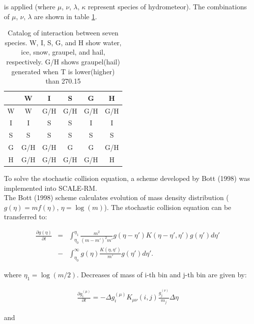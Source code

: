 is applied (where $\mu$, $\nu$, $\lambda$, $\kappa$ represent species of hydrometeor). The combinations of $\mu$, $\nu$, $\lambda$ are shown in table \ref{table-s10-1}.

\begin{table}[h]
\begin{center}
\caption{Catalog of interaction between seven species. W, I, S, G, and H show water, ice, snow, graupel, and hail, respectively. G/H shows graupel(hail) generated when T is lower(higher) than 270.15}
\label{table-s10-1}
\begin{tabular}{cccccc}
\hline
     & W   & I   & S   & G   & H   \\ \hline\hline
W    & W   & G/H & G/H & G/H & G/H \\ \hline
I    & I   & S   & S   & I   & I   \\ \hline
S    & S   & S   & S   & S   & S   \\ \hline
G    & G/H & G/H & G   & G   & G/H \\ \hline
H    & G/H & G/H & G/H & G/H & H   \\ \hline
\end{tabular}
\end{center}
\end{table}


To solve the stochastic collision equation, a scheme developed by Bott (1998)\cite{bott_1998} was implemented into SCALE-RM.\\
The Bott (1998)\cite{bott_1998} scheme calculates evolution of mass density distribution ($g(\eta)=mf(\eta)$, $\eta=\log(m)$). The stochastic collision equation can be transferred to:

\begin{eqnarray}
\frac{\partial g(\eta)}{\partial t}&=&\int_{\eta_{0}}^{\eta_{1}}\frac{m^{2}}{(m-m')^{2} m'}g(\eta-\eta') K(\eta-\eta',\eta')g(\eta')d\eta' \nonumber\\
&-&\int_{\eta_{0}}^{\infty} g(\eta)\frac{K(\eta,\eta')}{m'}g(\eta')d\eta'.\label{s10-17}
\end{eqnarray}

 where $\eta_{1}=\log(m/2)$. Decreases of mass of i-th bin and j-th bin are given by:

\begin{eqnarray}
\frac{\partial g_{i}^{(\mu)}}{\partial t}=-\Delta g^{(\mu)}_{i} K_{\mu\nu}(i,j)\frac{g_{j}^{(\nu)}}{m_{j}}\Delta \eta\label{s10-18}
\end{eqnarray}

and


